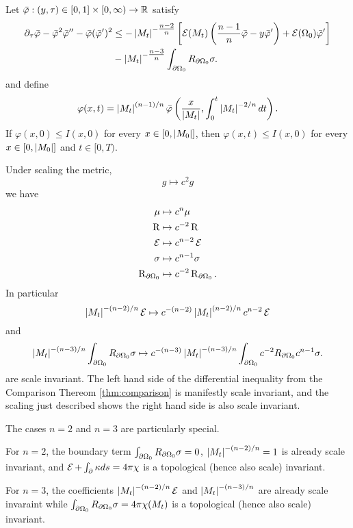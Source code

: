 \documentclass{amsart}
\begin{document}
\begin{thm}
\label{thm:comparison}
Let \(\bar{\varphi} : (y, \tau) \in [0, 1] \times [0, \infty) \to \mathbb{R}\) satisfy
\[
\begin{split}
\partial_{\tau} \bar{\varphi} - \bar{\varphi}^2 \bar{\varphi}'' - \bar{\varphi}(\bar{\varphi}')^2 &\leq -\left|{M_t}\right|^{-\tfrac{n-2}{n}} \left[\operatorname{\mathcal{E}}(M_t)\left(\frac{n-1}{n} \bar{\varphi} - y \bar{\varphi}'\right) + \operatorname{\mathcal{E}}(\Omega_0)\bar{\varphi}'\right] \\
&- \left|{M_t}\right|^{-\tfrac{n-3}{n}}\int_{\partial {\Omega_0}} R_{\partial {\Omega_0}}\sigma.
\end{split}
\]
and define
\[
\varphi(x, t) = \left|{M_t}\right|^{(n-1)/n} \bar{\varphi} \left(\frac{x}{\left|{M_t}\right|}, \int_0^t \left|{M_t}\right|^{-2/n} dt\right).
\]
If \(\varphi(x, 0) \leq I(x, 0)\) for every \(x \in [0, \left|{M_0}\right|]\), then \(\varphi(x, t) \leq I(x, 0)\) for every \(x \in [0, \left|{M_0}\right|]\) and \(t \in [0, T)\).
\end{thm}

\begin{rem}
\label{rem:scaling}
Under scaling the metric,
\[
g \mapsto c^2 g
\]
we have
\begin{align*}
\mu &\mapsto c^n \mu \\
\operatorname{R} &\mapsto c^{-2} \operatorname{R} \\
\operatorname{\mathcal{E}} &\mapsto c^{n-2} \operatorname{\mathcal{E}} \\
\sigma &\mapsto c^{n-1} \sigma \\
\operatorname{R}_{\partial {\Omega_0}} &\mapsto c^{-2} \operatorname{R}_{\partial {\Omega_0}}.
\end{align*}
In particular
\[
\left|{M_t}\right|^{-(n-2)/n} \operatorname{\mathcal{E}} \mapsto c^{-(n-2)} \left|{M_t}\right|^{(n-2)/n} c^{n-2}\operatorname{\mathcal{E}}
\]
and
\[
\left|{M_t}\right|^{-(n-3)/n} \int_{\partial {\Omega_0}} R_{\partial {\Omega_0}}\sigma \mapsto c^{-(n-3)} \left|{M_t}\right|^{-(n-3)/n} \int_{\partial {\Omega_0}} c^{-2} R_{\partial {\Omega_0}} c^{n-1}\sigma.
\]
are scale invariant. The left hand side of the differential inequality from the Comparison Thereom \ref{thm:comparison} is manifestly scale invariant, and the scaling just described shows the right hand side is also scale invariant.

The cases \(n = 2\) and \(n = 3\) are particularly special.

For \(n=2\), the boundary term \(\int_{\partial {\Omega_0}} R_{\partial {\Omega_0}}\sigma = 0\), \(\left|{M_t}\right|^{-(n-2)/n} = 1\) is already scale invariant, and \(\einsteinhilbert + \int_{\bdry{\empty}} \kappa ds = 4\pi \chi\) is a topological (hence also scale) invariant.

For \(n=3\), the coefficients \(\left|{M_t}\right|^{-(n-2)/n} \operatorname{\mathcal{E}}\) and \(\left|{M_t}\right|^{-(n-3)/n}\) are already scale invaraint while \(\int_{\partial {\Omega_0}} R_{\partial {\Omega_0}}\sigma = 4\pi \chi(M_t)\) is a topological (hence also scale) invariant.
\end{rem}
\end{document}
